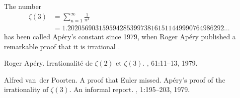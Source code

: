 \documentclass[12pt]{article}
\begin{document}
The number 
\begin{align*}
\zeta(3) &= \sum_{n=1}^\infty\frac{1}{n^3} \\
         &= 1.202056903159594285399738161511449990764986292\ldots
\end{align*}
has been called Ap\'ery's constant since 1979, when Roger Ap\'ery published
a remarkable proof that it is irrational \cite{cite:apery_irr}. 

\begin{thebibliography}{1}

Roger Ap{\'e}ry.
\newblock Irrationalit{\'e} de $\zeta(2)$ et $\zeta(3)$.
, 61:11--13, 1979.

Alfred van~der Poorten.
\newblock A proof that {Euler} missed. {Ap{\'e}ry's} proof of the irrationality
  of $\zeta(3)$. An informal report.
, 1:195--203, 1979.

\end{thebibliography}

%
\end{document}
